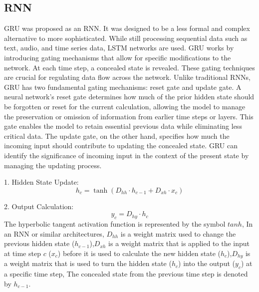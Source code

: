 \documentclass[a4paper,fleqn]{cas-sc}
\begin{document}
\subsection{RNN}
GRU was proposed as an RNN. It was designed to be a less formal and complex alternative to more sophisticated. While still processing sequential data such as text, audio, and time series data, LSTM networks are used. GRU works by introducing gating mechanisms that allow for specific modifications to the network. At each time step, a concealed state is revealed. These gating techniques are crucial for regulating data flow across the network. Unlike traditional RNNs, GRU has two fundamental gating mechanisms: reset gate and update gate\cite{sun2016depth}. A neural network's reset gate determines how much of the prior hidden state should be forgotten or reset for the current calculation, allowing the model to manage the preservation or omission of information from earlier time steps or layers. This gate enables the model to retain essential previous data while eliminating less critical data. The update gate, on the other hand, specifies how much the incoming input should contribute to updating the concealed state. GRU can identify the significance of incoming input in the context of the present state by managing the updating process\cite{torres2021deep}.




1. Hidden State Update:
\begin{equation}
h_c = \tanh(D_{hh} \cdot h_{c-1} + D_{xh} \cdot x_c)
\end{equation}

2. Output Calculation:
\begin{equation}
y_c = D_{hy} \cdot h_c
\end{equation}
The hyperbolic tangent activation function is represented by the symbol $tanh$, In an RNN or similar architectures, $D_{hh}$ is a weight matrix used to change the previous hidden state ($h_{c-1}$),$D_{xh}$ is a weight matrix that is applied to the input at time step $c$ ($x_c$) before it is used to calculate the new hidden state ($h_c$),$D_{hy}$ is a weight matrix that is used to turn the hidden state ($h_c$) into the output ($y_c$) at a specific time step, The concealed state from the previous time step is denoted by $h_{c-1}$.




\end{document}
